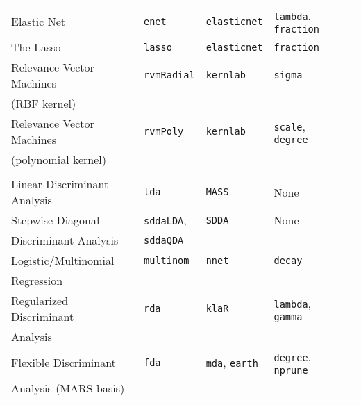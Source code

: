 \documentclass[12pt]{article}
\begin{document}
\begin{longtable}{lllll}
      Elastic Net &
         \texttt{enet} & 
            \texttt{elasticnet}      & 
            \texttt{lambda}, \texttt{fraction} \\          

      The Lasso &
         \texttt{lasso} & 
            \texttt{elasticnet}      & 
            \texttt{fraction} \\       
            
      Relevance Vector Machines  &
         \texttt{rvmRadial} & 
            \texttt{kernlab}       & 
            \texttt{sigma} \\            
      \:\: (RBF kernel) & & &\\   
      
      Relevance Vector Machines  &
         \texttt{rvmPoly} & 
            \texttt{kernlab}       & 
            \texttt{scale}, \texttt{degree} \\            
      \:\: (polynomial kernel) & & &\\               

      \\       
             

      Linear Discriminant Analysis &
         \texttt{lda} & 
            \texttt{MASS}       &          
            None\\                     

      Stepwise Diagonal &
        \texttt{sddaLDA}, &
        \texttt{SDDA} &
        None \\
      \:\: Discriminant Analysis & \texttt{sddaQDA} & &\\
            
      Logistic/Multinomial  &
         \texttt{multinom} & 
            \texttt{nnet}       & 
            \texttt{decay}& \\   
      \: \: Regression \\ 
                     
      Regularized Discriminant  &
         \texttt{rda} & 
            \texttt{klaR}       & 
            \texttt{lambda}, \texttt{gamma} & \\*
      \: \: Analysis \\*
      
      Flexible Discriminant  &
         \texttt{fda} & 
            \texttt{mda}, \texttt{earth}       & 
            \texttt{degree}, \texttt{nprune} & \\
      \: \: Analysis (MARS basis)\\      
      

\end{longtable}
\end{document}
